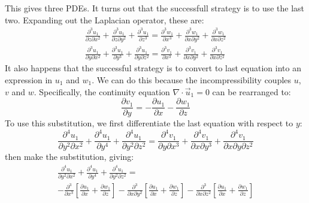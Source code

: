 \documentclass[12pt, a4paper, twoside, openright]{book}
\begin{document}
This gives three PDEs.  It turns out that the successfull strategy is to use the last two. Expanding out the Laplacian operator, these are:
\begin{gather}
\frac{\partial^3 u_1}{\partial z \partial x^2} + \frac{\partial^3 u_1}{\partial z \partial y^2}
+ \frac{\partial^3 u_1}{\partial z^3} =
\frac{\partial^3 w_1}{\partial x^3} + \frac{\partial^3 w_1}{\partial x \partial y^2}
+ \frac{\partial^3 w_1}{\partial x \partial z^2} 
\\
\frac{\partial^3 u_1}{\partial y \partial x^2} + \frac{\partial^3 u_1}{\partial y^3}
+ \frac{\partial^3 u_1}{\partial y \partial z^2} =
\frac{\partial^3 v_1}{\partial x^3} + \frac{\partial^3 v_1}{\partial x \partial y^2}
+ \frac{\partial^3 v_1}{\partial x \partial z^2} 
\end{gather}
It also happens that the successful strategy is to convert to last equation into an expression in $u_1$ and $w_1$.  We can do this because the incompressibility couples $u$, $v$ and $w$.  Specifically, the continuity equation $\nabla \cdot \vec{u}_1 = 0$ can be rearranged to:
\begin{equation}
\frac{\partial v_1}{\partial y} = - \frac{\partial u_1}{\partial x} - \frac{\partial w_1}{\partial z}
\end{equation}
To use this substitution, we first differentiate the last equation with respect to $y$:
\begin{equation}
\frac{\partial^4 u_1}{\partial y^2 \partial x^2} + \frac{\partial^4 u_1}{\partial y^4}
+ \frac{\partial^4 u_1}{\partial y^2 \partial z^2} =
\frac{\partial^4 v_1}{\partial y \partial x^3} + \frac{\partial^4 v_1}{\partial x \partial y^3}
+ \frac{\partial^4 v_1}{\partial x \partial y \partial z^2} 
\end{equation}
then make the substitution, giving:
\begin{multline}
\frac{\partial^4 u_1}{\partial y^2 \partial x^2} + \frac{\partial^4 u_1}{\partial y^4}
+ \frac{\partial^4 u_1}{\partial y^2 \partial z^2} =  \\
- \frac{\partial^3 }{\partial x^3}
 \left[ \frac{\partial u_1}{\partial x} + \frac{\partial w_1}{\partial z} \right] 
- \frac{\partial^3 }{\partial x \partial y^2}
 \left[ \frac{\partial u_1}{\partial x} + \frac{\partial w_1}{\partial z} \right] 
- \frac{\partial^3 }{\partial x \partial z^2}
 \left[ \frac{\partial u_1}{\partial x} + \frac{\partial w_1}{\partial z} \right]  
\end{multline}
\end{document}
